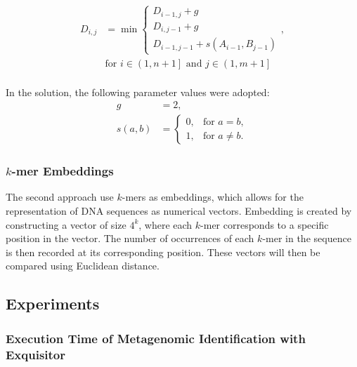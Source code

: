 \documentclass[biomedinformatics,article,submit,moreauthors]{Definitions/mdpi}
\begin{document}
                \begin{equation}
                    \begin{aligned}
                        D_{i,j} &= \min
                        \begin{cases}
                        D_{i - 1, j} + g \\
                        D_{i, j - 1} + g \\
                        D_{i - 1, j - 1} + s(A_{i - 1}, B_{j - 1})
                        \end{cases},
                        \\ & \text{for } i \in \left(1, n + 1\right] \text{ and } j \in \left(1, m + 1\right] \\
                    \end{aligned}
                    \label{Equation:NeedlemanWunschModified}
                \end{equation}

                In the solution, the following parameter values were adopted:
                \begin{align*}
                    g &= 2, \\
                    s(a, b) &= \begin{cases}
                        0, & \text{for } a = b, \\
                        1, & \text{for } a \neq b.
                    \end{cases}
                \end{align*}

            \subsubsection{$k$-mer Embeddings}
                The second approach use $k$-mers as embeddings, which allows for the representation of DNA sequences as numerical vectors. Embedding is created by constructing a vector of size $4^k$, where each $k$-mer corresponds to a specific position in the vector. The number of occurrences of each $k$-mer in the sequence is then recorded at its corresponding position. These vectors will then be compared using Euclidean distance.

        \subsection{Experiments}
            \subsubsection{Execution Time of Metagenomic Identification with Exquisitor}
\end{document}

